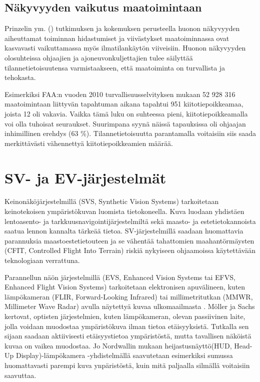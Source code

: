 \documentclass[utf8,bachelor,manualbib]{gradu3}
\begin{document}
\section{Näkyvyyden vaikutus maatoimintaan}

Prinzelin ym. (\citeyear{prinzel2013}) tutkimuksen ja kokemuksen perusteella huonon näkyvyyden aiheuttamat toiminnan hidastumiset ja viivästykset maatoiminnassa ovat kasvavasti vaikuttamassa myös ilmatilankäytön viiveisiin. Huonon näkyvyyden olosuhteissa ohjaajien ja ajoneuvonkuljettajien tulee säilyttää tilannetietoisuutensa varmistaakseen, että maatoiminta on turvallista ja tehokasta.

Esimerkiksi FAA:n vuoden 2010 turvallisuusselvityksen mukaan 52 928 316 maatoimintaan liittyvän tapahtuman aikana tapahtui 951 kiitotiepoikkeamaa, joista 12 oli vakavia. Vaikka tämä luku on suhteessa pieni, kiitotiepoikkeamalla voi olla tuhoisat seuraukset. Suurimpana syynä näissä tapauksissa oli ohjaajan inhimillinen erehdys (63 \%). Tilannetietoisuutta parantamalla voitaisiin siis saada merkittävästi vähennettyä kiitotiepoikkeamien määrää. \citep{prinzel2013}


\chapter{SV- ja EV-järjestelmät}

Keinonäköjärjestelmillä (SVS, Synthetic Vision Systems) tarkoitetaan keinotekoisen ympäristökuvan luomista tietokoneella. Kuva luodaan yhdistäen lentoasento- ja tarkkuusnavigointijärjestelmiltä sekä maasto- ja estetietokannoista saatua lennon kannalta tärkeää tietoa. SV-järjestelmillä saadaan huomattavia parannuksia maastoestetietouteen ja se vähentää tahattomien maahantörmäysten (CFIT, Controlled Flight Into Terrain) riskiä nykyiseen ohjaamoissa käytettävään teknologiaan verrattuna. \citep{baileyym2007}

Parannellun näön järjestelmillä (EVS, Enhanced Vision Systems tai EFVS, Enhanced Flight Vision Systems) tarkoitetaan elektronisen apuvälineen, kuten lämpökameran (FLIR, Forward-Looking Infrared) tai millimetritutkan (MMWR, Millimeter Wave Radar) avulla näytettyä kuvaa ulkomaailmasta \citep{baileyym2007}. Möller ja Sachs \citeyearpar{mollersachs1994} kertovat, optisten järjestelmien, kuten lämpökameran, olevan passiivinen laite, jolla voidaan muodostaa ympäristökuva ilman tietoa etäisyyksistä. Tutkalla sen sijaan saadaan aktiivisesti etäisyystietoa ympäristöstä, mutta tavallisen näköistä kuvaa on vaikea muodostaa.  Jo Nordwallin \citeyearpar{nordwall1993} mukaan heijastusnäyttö(HUD, Head-Up Display)-lämpökamera -yhdistelmällä saavutetaan esimerkiksi sumussa huomattavasti parempi kuva ynpäristöstä, kuin mitä paljaalla silmällä voitaisiin saavuttaa. 
\end{document}
